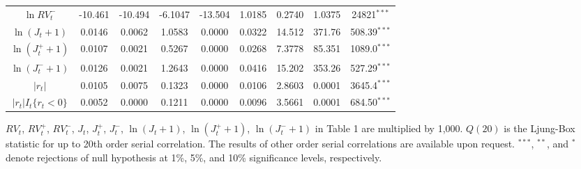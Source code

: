 \documentclass[10pt]{article}
\begin{document}
\begin{landscape}
\begin{center}
\begin{tabular}{ccccccccc}
$\ln RV_t^{-}$         &-10.461       &-10.494   &-6.1047        &-13.504     &1.0185               &0.2740            &1.0375          &  24821$^{\ast \ast \ast}$                \\
$\ln (J_t+1)$          &0.0146         &0.0062     &1.0583         &0.0000        &0.0322               &14.512            &371.76          & 508.39$^{\ast \ast \ast}$               \\
$\ln (J_t^{+}+1)$     &0.0107         &0.0021     &0.5267         &0.0000        &0.0268               &7.3778            &85.351          & 1089.0$^{\ast \ast \ast}$               \\
$\ln (J_t^{-}+1)$     &0.0126        &0.0021      &1.2643         &0.0000       &0.0416               &15.202             &353.26          & 527.29$^{\ast \ast \ast}$               \\
$|r_t|$                    &0.0105         &0.0075     &0.1323         &0.0000        &0.0106              &2.8603            &0.0001          &  3645.4$^{\ast \ast \ast}$               \\
$|r_t|I_t{ \{r_t<0\} }$  &0.0052         &0.0000     &0.1211         &0.0000         &0.0096               &3.5661            &0.0001         &  684.50$^{\ast \ast \ast}$              \\        
    \hline 
   \end{tabular}
\end{center}
$RV_t$, $RV_t^{+}$, $RV_t^{-}$, $J_t$, $J_t^{+}$, $J_t^{-}$, $\ln (J_t+1)$, $\ln (J_t^{+}+1)$, $\ln (J_t^{-}+1)$ in Table 1 are multiplied by 1,000. 
$Q(20)$ is the Ljung-Box statistic for up to 20th order serial correlation. The results of other order serial correlations are available upon request. 
$^{***}$, $^{**}$, and $^{*}$ denote rejections of null hypothesis at 1\%, 5\%, and 10\% significance levels, respectively.
\end{landscape}
\end{document}
